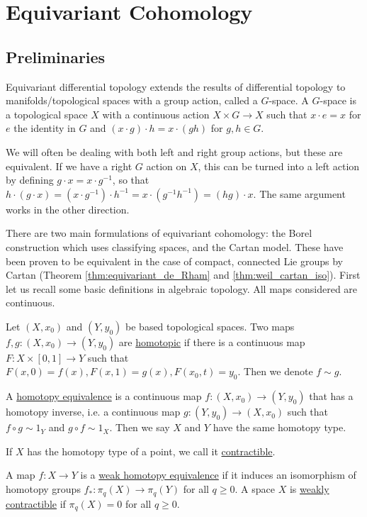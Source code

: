\chapter{Equivariant Cohomology}
\label{chapter_equivariant}

\section{Preliminaries}
Equivariant differential topology extends the results of differential topology
to manifolds/topological spaces with a group action, called a $G$-space. A
$G$-space is a topological space $X$ with a continuous action $X\times G \to X$ 
such that $x\cdot e = x$ for $e$ the identity in  $G$ and $(x\cdot g) \cdot h =
x\cdot (gh)$ for $g,h\in G$. 

We will often be dealing with both left and right group actions, but these are
equivalent. If we have a right $G$ action on $X$, this can be turned into a left
action by defining  $g \cdot x = x \cdot g^{-1}$, so that $h\cdot (g\cdot x) =
(x\cdot g^{-1})\cdot h^{-1} = x\cdot (g^{-1}h^{-1}) = (hg)\cdot x$. The same
argument works in the other direction.


There are two main formulations of equivariant
cohomology: the Borel construction which uses classifying spaces, and the Cartan model.
These have been proven to be equivalent in the case of compact, connected Lie groups 
by Cartan (Theorem \ref{thm:equivariant_de_Rham} and \ref{thm:weil_cartan_iso}). 
First let us recall some basic definitions in algebraic topology. All maps
considered are continuous.
\begin{defn}
	Let $(X,x_0)$ and $(Y,y_0)$ be based topological spaces. Two maps
	$f,g:(X,x_0)\to(Y,y_0)$ are \underline{homotopic} if there is a continuous
	map $F:X\times [0,1]\to Y$ such that
	$F(x,0)=f(x),F(x,1)=g(x),F(x_0,t)=y_0$. Then we denote $f\sim g$.

	A \underline{homotopy equivalence} is a continuous map $f:(X,x_0)\to(Y,y_0)$
	that has a homotopy inverse, i.e. a continuous map $g:(Y,y_0)\to(X,x_0)$
	such that $f\circ g \sim 1_Y$ and $g\circ f \sim 1_X$.
	Then we say $X$ and  $Y$ have the same homotopy type.

	If $X$ has the homotopy type of a point, we call it
	\underline{contractible}.

	A map $f:X\to Y$ is a \underline{weak homotopy equivalence} if
	it induces an isomorphism of homotopy groups
	$f_*:\pi_q(X)\to\pi_q(Y)$ for all  $q\geq 0$. 
	A space $X$ is \underline{weakly contractible} if $\pi_q(X)=0$ for all  $q\geq 0$. 
\end{defn}

